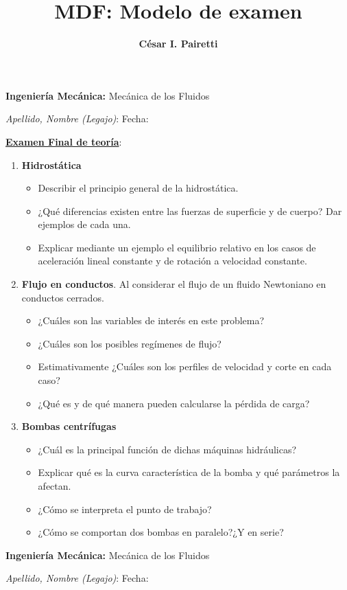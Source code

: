 \documentclass[a4paper,10pt]{article}
\title{MDF: Modelo de examen}
\author{{{\bf César I. Pairetti}}}
\newcommand{\MDF}
{
\begin{center}
{\Large {\bf Ingeniería Mecánica:} Mecánica de los Fluidos}
\end{center}
\textit{Apellido, Nombre (Legajo)}: \hskip 8.cm Fecha:
\vspace{0.2cm}
}
\begin{document}
\MDF

\noindent \underline{\textbf{Examen Final de teoría}}:

\begin{enumerate}
  \item {\bf Hidrostática}
	\begin{itemize} 
	\item Describir el principio general de la hidrostática.
	\item ¿Qué diferencias existen entre las fuerzas de superficie y de cuerpo? Dar ejemplos de cada una.
	\item Explicar mediante un ejemplo el equilibrio relativo en los casos de aceleración lineal constante y
	de rotación a velocidad constante.
	\end{itemize}
	
    \item {\bf Flujo en conductos}. Al considerar el flujo de un fluido Newtoniano en conductos cerrados.
  \begin{itemize}
  \item ¿Cuáles son las variables de interés en este problema?
  \item ¿Cuáles son los posibles regímenes de flujo?
  \item Estimativamente ¿Cuáles son los perfiles de velocidad y corte en cada caso?
  \item ¿Qué es y de qué manera pueden calcularse la pérdida de carga?
  \end{itemize}

  \item {\bf Bombas centrífugas}

  \begin{itemize}
  \item ¿Cuál es la principal función de dichas máquinas hidráulicas? 
  \item Explicar qué es la curva característica de la bomba y qué parámetros la afectan.
  \item ¿Cómo se interpreta el punto de trabajo?
  \item ¿Cómo se comportan dos bombas en paralelo?¿Y en serie?
  \end{itemize}


%    
\end{enumerate}
\clearpage
\MDF
\end{document}
